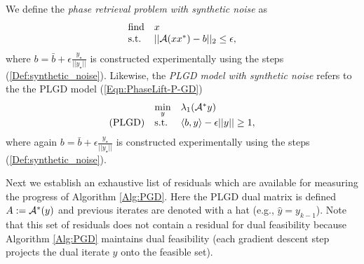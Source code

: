 We define the \textit{phase retrieval problem with synthetic noise} as
\begin{equation} \label{Eqn:phase_retrieval_synthetic_noise}
\begin{array}{ll}
		\text{find}
		&	x
			\\
		\textnormal{s.t.}
		& 	||{\mathcal A} (xx^*) - b||_2 \leq \epsilon,
\end{array}
\end{equation}
where $b = \bar{b} + \epsilon \frac{y_\star}{|| y_\star ||}$ is constructed experimentally using the steps (\ref{Def:synthetic_noise}).  Likewise, the \textit{PLGD model with synthetic noise} refers to the the PLGD model (\ref{Eqn:PhaseLift-P-GD}) 
\begin{equation} 			\label{Eqn:PhaseLift-GD_synthetic_noise}
\begin{array}{lll}
	&\min\limits_{\substack{y}}
					&	\lambda_1({\mathcal A}^* y)
						\\
	\textnormal{(PLGD)}
				&	\textnormal{s.t.}
					&	\langle b, y \rangle - \epsilon ||y|| \geq 1,
\end{array}
\end{equation}
where again $b = \bar{b} + \epsilon \frac{y_\star}{|| y_\star ||}$ is constructed experimentally using the steps (\ref{Def:synthetic_noise}).  











Next we establish an exhaustive list of residuals which are available for measuring the progress of Algorithm \ref{Alg:PGD}.  Here the PLGD dual matrix is defined $A:= {\mathcal A}^*(y)$ and previous iterates are denoted with a hat (e.g., $ \hat{y} = y_{k-1} $).  Note that this set of residuals does not contain a residual for dual feasibility because Algorithm \ref{Alg:PGD} maintains dual feasibility (each gradient descent step projects the dual iterate $y$ onto the feasible set).

